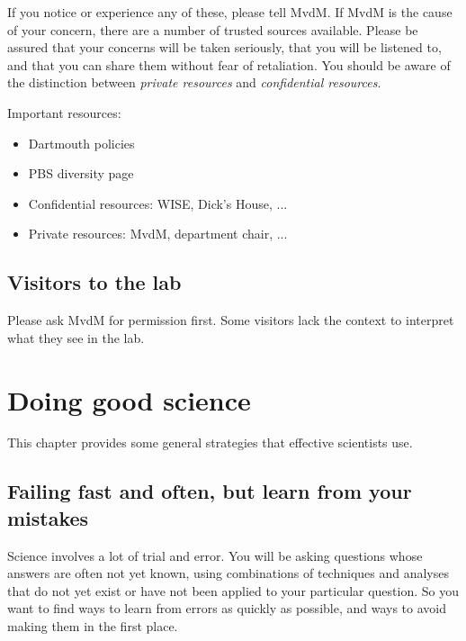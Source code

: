 \documentclass{tufte-book}
\begin{document}
If you notice or experience any of these, please tell MvdM. If MvdM is
the cause of your concern, there are a number of trusted sources
available\sidenote{}. Please be assured that your concerns will be
taken seriously, that you will be listened to, and that you can share
them without fear of retaliation. You should be aware of the
distinction between {\it private resources} and {\it confidential
  resources}.

Important resources:

\begin{itemize}
\item{Dartmouth policies}
\item{PBS diversity page}
\item{Confidential resources: WISE, Dick's House, ...}
\item{Private resources: MvdM, department chair, ...}
\end{itemize}

\section{Visitors to the lab}

Please ask MvdM for permission first. Some visitors lack the context
to interpret what they see in the lab.



\chapter{Doing good science}

This chapter provides some general strategies that effective
scientists use.

\section{Failing fast and often, but learn from your mistakes}

Science involves a lot of trial and error. You will be asking
questions whose answers are often not yet known, using combinations of
techniques and analyses that do not yet exist or have not been applied
to your particular question. So you want to find ways to learn from
errors as quickly as possible, and ways to avoid making them in the
first place.
\end{document}
